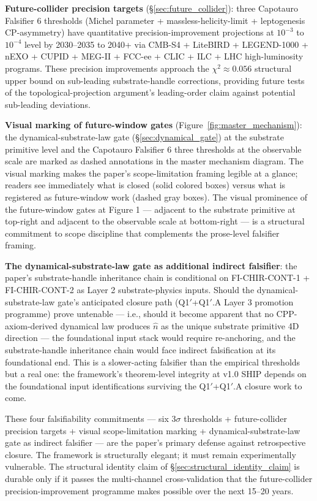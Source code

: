 \documentclass[11pt,letterpaper]{article}
\begin{document}
\textbf{Future-collider precision targets} (§\ref{sec:future_collider}): three Capotauro Falsifier 6 thresholds (Michel parameter + massless-helicity-limit + leptogenesis CP-asymmetry) have quantitative precision-improvement projections at $10^{-3}$ to $10^{-4}$ level by 2030--2035 to 2040+ via CMB-S4 + LiteBIRD + LEGEND-1000 + nEXO + CUPID + MEG-II + FCC-ee + CLIC + ILC + LHC high-luminosity programs. These precision improvements approach the $\chi^2 \approx 0.056$ structural upper bound on sub-leading substrate-handle corrections, providing future tests of the topological-projection argument's leading-order claim against potential sub-leading deviations.

\textbf{Visual marking of future-window gates} (Figure~\ref{fig:master_mechanism}): the dynamical-substrate-law gate (§\ref{sec:dynamical_gate}) at the substrate primitive level and the Capotauro Falsifier 6 three thresholds at the observable scale are marked as dashed annotations in the master mechanism diagram. The visual marking makes the paper's scope-limitation framing legible at a glance; readers see immediately what is closed (solid colored boxes) versus what is registered as future-window work (dashed gray boxes). The visual prominence of the future-window gates at Figure 1 — adjacent to the substrate primitive at top-right and adjacent to the observable scale at bottom-right — is a structural commitment to scope discipline that complements the prose-level falsifier framing.

\textbf{The dynamical-substrate-law gate as additional indirect falsifier}: the paper's substrate-handle inheritance chain is conditional on FI-CHIR-CONT-1 + FI-CHIR-CONT-2 as Layer 2 substrate-physics inputs. Should the dynamical-substrate-law gate's anticipated closure path (Q1$'$+Q1$'$.A Layer 3 promotion programme) prove untenable — i.e., should it become apparent that no CPP-axiom-derived dynamical law produces $\hat{n}$ as the unique substrate primitive 4D direction — the foundational input stack would require re-anchoring, and the substrate-handle inheritance chain would face indirect falsification at its foundational end. This is a slower-acting falsifier than the empirical thresholds but a real one: the framework's theorem-level integrity at v1.0 SHIP depends on the foundational input identifications surviving the Q1$'$+Q1$'$.A closure work to come.

These four falsifiability commitments — six $3\sigma$ thresholds + future-collider precision targets + visual scope-limitation marking + dynamical-substrate-law gate as indirect falsifier — are the paper's primary defense against retrospective closure. The framework is structurally elegant; it must remain experimentally vulnerable. The structural identity claim of §\ref{sec:structural_identity_claim} is durable only if it passes the multi-channel cross-validation that the future-collider precision-improvement programme makes possible over the next 15--20 years.
\end{document}
